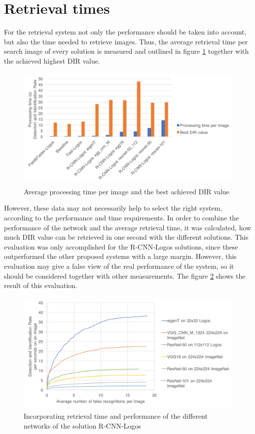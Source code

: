\section{Retrieval times}
For the retrieval system not only the performance should be taken into account, but also the time needed to retrieve images. Thus, the average retrieval time per search image of every solution is measured and outlined in figure \ref{f:timebestdir} together with the achieved highest DIR value.
\begin{figure}
  \centering
  \includegraphics[height=60mm]{images/mt/timebestdir.png}
  \caption{Average processing time per image and the best achieved DIR value}
  \label{f:timebestdir}
\end{figure}
However, these data may not necessarily help to select the right system, according to the performance and time requirements. In order to combine the performance of the network and the average retrieval time, it was calculated, how much DIR value can be retrieved in one second with the different solutions. This evaluation was only accomplished for the R-CNN-Logos solutions, since these outperformed the other proposed systems with a large margin. However, this evaluation may give a false view of the real performance of the system, so it should be considered together with other measurements. The figure \ref{f:dirpertime} shows the result of this evaluation.
\begin{figure}
  \centering
  \includegraphics[height=60mm]{images/mt/dirpertime.png}
  \caption{Incorporating retrieval time and performance of the different networks of the solution R-CNN-Logos}
  \label{f:dirpertime}
\end{figure}